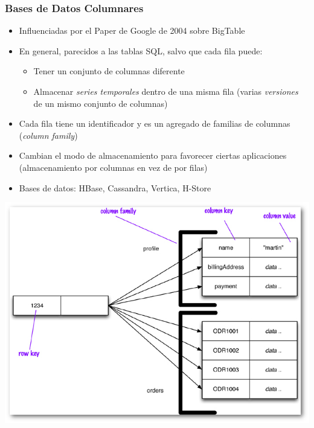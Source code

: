 \documentclass[14pt]{beamer}
\begin{document}
\begin{frame}
  \frametitle{Bases de Datos Columnares}
\begin{itemize}
\item Influenciadas por el Paper de Google de 2004 sobre BigTable
\item En general, parecidos a las tablas SQL, salvo que cada fila puede:
  \begin{itemize}
  \item Tener un conjunto de columnas diferente
\item Almacenar {\em series temporales} dentro de una misma fila (varias
  {\em versiones} de un mismo conjunto de columnas)
  \end{itemize}
\item Cada fila tiene un identificador y es un agregado de familias de
  columnas ({\em column family})

\item Cambian el modo de almacenamiento para favorecer ciertas aplicaciones
  (almacenamiento por columnas en vez de por filas)
\item Bases de datos: HBase, Cassandra, Vertica, H-Store
\end{itemize}
\end{frame}

\begin{frame}[plain]
\includegraphics[width=\textwidth]{img/column}
\end{frame}
\end{document}
